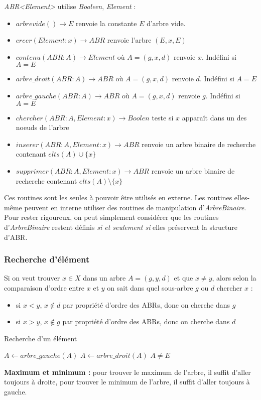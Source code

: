 \documentclass[../../../main.tex]{subfiles}
\begin{document}
\textit{ABR\textless{}Element\textgreater} utilise \textit{Booleen}, \textit{Element} :
\begin{itemize}
	\item $arbrevide()\rightarrow E$ renvoie la constante $E$ d'arbre vide.
	\item $creer(Element:x) \rightarrow ABR$ renvoie l'arbre $(E, x, E)$
	\item $contenu(ABR:A)\rightarrow Element$ où $A = (g, x, d)$ renvoie $x$. Indéfini si $A = E$
	\item $arbre\_droit(ABR:A)\rightarrow ABR$ où $A = (g, x, d)$ renvoie $d$. Indéfini si $A = E$
	\item $arbre\_gauche(ABR:A)\rightarrow ABR$ où $A = (g, x, d)$ renvoie $g$. Indéfini si $A = E$
	\item $chercher(ABR:A, Element:x)\rightarrow Boolen$ teste si $x$ apparaît dans un des noeuds de l'arbre
	\item $inserer(ABR:A, Element:x)\rightarrow ABR$ renvoie un arbre binaire de recherche contenant $elts(A)\cup\{x\}$
	\item $supprimer(ABR:A, Element:x)\rightarrow ABR$ renvoie un arbre binaire de recherche contenant $elts(A)\setminus\{x\}$
\end{itemize}

Ces routines sont les seules à pouvoir être utilisés en externe. Les routines elles-même peuvent en interne utiliser des routines de manipulation d'\textit{ArbreBinaire}. Pour rester rigoureux, on peut simplement considérer que les routines d'\textit{ArbreBinaire} restent définis \textit{si et seulement si} elles préservent la structure d'ABR.
\subsubsection{Recherche d'élément}
Si on veut trouver $x\in X$ dans un arbre $A = (g, y, d)$ et que $x \neq y$, alors selon la comparaison d'ordre entre $x$ et $y$ on sait dans quel sous-arbre $g$ ou $d$ chercher $x$ :
\begin{itemize}
	\item si $x < y$, $x\notin d$ par propriété d'ordre des ABRs, donc on cherche dans $g$
	\item si $x > y$, $x\notin g$ par propriété d'ordre des ABRs, donc on cherche dans $d$
\end{itemize}
\begin{algorithm}
\caption{Recherche d'un élément \label{alg:recherche_abr}}
 {
	 {
		$A\leftarrow arbre\_gauche(A)$\;
	} {
		$A\leftarrow arbre\_droit(A)$\;
	}
}
\Return $A\neq E$
\end{algorithm}
\textbf{Maximum et minimum :} pour trouver le maximum de l'arbre, il suffit d'aller toujours à droite, pour trouver le minimum de l'arbre, il suffit d'aller toujours à gauche.
\end{document}
